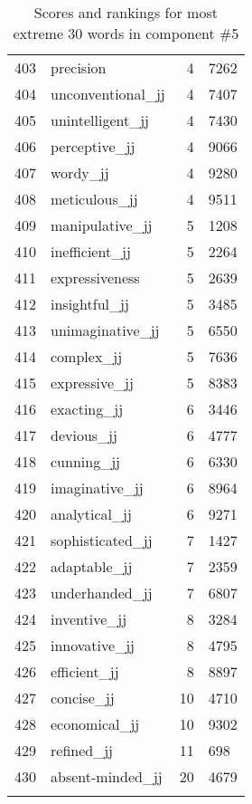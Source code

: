 \begin{longtable}[!htbp]{| rlr@{.}l |}
    403 & precision & 4 & 7262 \\
    404 & unconventional\_jj & 4 & 7407 \\
    405 & unintelligent\_jj & 4 & 7430 \\
    406 & perceptive\_jj & 4 & 9066 \\
    407 & wordy\_jj & 4 & 9280 \\
    408 & meticulous\_jj & 4 & 9511 \\
    409 & manipulative\_jj & 5 & 1208 \\
    410 & inefficient\_jj & 5 & 2264 \\
    411 & expressiveness & 5 & 2639 \\
    412 & insightful\_jj & 5 & 3485 \\
    413 & unimaginative\_jj & 5 & 6550 \\
    414 & complex\_jj & 5 & 7636 \\
    415 & expressive\_jj & 5 & 8383 \\
    416 & exacting\_jj & 6 & 3446 \\
    417 & devious\_jj & 6 & 4777 \\
    418 & cunning\_jj & 6 & 6330 \\
    419 & imaginative\_jj & 6 & 8964 \\
    420 & analytical\_jj & 6 & 9271 \\
    421 & sophisticated\_jj & 7 & 1427 \\
    422 & adaptable\_jj & 7 & 2359 \\
    423 & underhanded\_jj & 7 & 6807 \\
    424 & inventive\_jj & 8 & 3284 \\
    425 & innovative\_jj & 8 & 4795 \\
    426 & efficient\_jj & 8 & 8897 \\
    427 & concise\_jj & 10 & 4710 \\
    428 & economical\_jj & 10 & 9302 \\
    429 & refined\_jj & 11 & 698 \\
    430 & absent-minded\_jj & 20 & 4679 \\
    \hline
    \caption{Scores and rankings for most extreme 30 words in component \#5} \\
\end{longtable}

